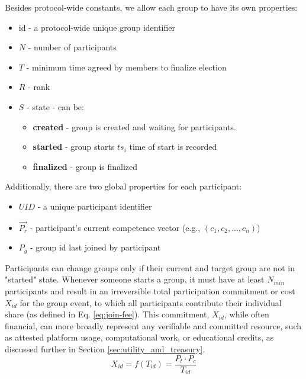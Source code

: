 \documentclass{article}
\begin{document}
\begin{CJK}{UTF8}{gbsn}
    Besides protocol-wide constants, we allow each group to have its own properties:

    \begin{itemize}[nosep]
        \item id - a protocol-wide unique group identifier
        \item $N$ - number of participants
        \item $T$ - minimum time agreed by members to finalize election
        \item $R$ - rank
        \item $S$ - state - can be:
              \begin{itemize}[nosep]
                  \item \textbf{created} - group is created and waiting for participants.
                  \item \textbf{started} - group starts $ts_i$ time of start is recorded
                  \item \textbf{finalized} - group is finalized
              \end{itemize}
    \end{itemize}

    Additionally, there are two global properties for each participant:

    \begin{itemize}[nosep]
        \item  $UID$ - a unique participant identifier
        \item  $\vec{P_r}$ - participant's current competence vector (e.g., $(c_1, c_2, ..., c_n)$)
        \item $P_g$ - group id last joined by participant
    \end{itemize}

    Participants can change groups only if their current and target group are not in "started" state. Whenever someone starts a group, it must have at least $N_{min}$ participants and result in an irreversible total participation commitment or cost $X_{id}$ for the group event, to which all participants contribute their individual share (as defined in Eq. \ref{eq:join-fee}). This commitment, $X_{id}$, while often financial, can more broadly represent any verifiable and committed resource, such as attested platform usage, computational work, or educational credits, as discussed further in Section \ref{sec:utility_and_treasury}.
    \begin{equation}
        \label{eq:group-fee}
        X_{id} = f(T_{id}) = \dfrac{P_t \cdot  P_c }{T_{id}}
    \end{equation}


\end{CJK}
\end{document}
